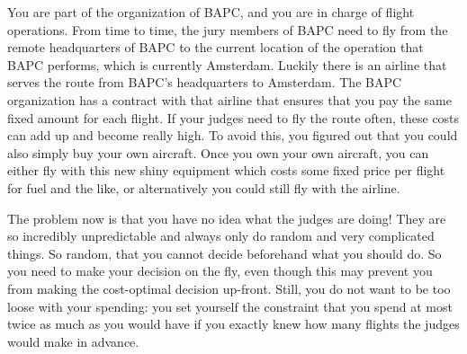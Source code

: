 

\newcommand{\maxa}{10^6}

You are part of the organization of BAPC, and you are in charge of flight operations.
From time to time, the jury members of BAPC
need to fly from the remote headquarters of BAPC to the current location of the operation that BAPC performs,
which is currently Amsterdam.
Luckily there is an airline that serves the route from BAPC's headquarters to Amsterdam.
The BAPC organization has a contract with that airline that ensures that you pay the same fixed amount for each flight.
If your judges need to fly the route often, these costs can add up and become really high.
To avoid this, you figured out that you could also simply buy your own aircraft.
Once you own your own aircraft, you can either fly with this new shiny
equipment which costs some fixed price per flight for fuel and the like, or
alternatively you could still fly with the airline.

The problem now is that you have no idea what the judges are doing!
They are so incredibly unpredictable and always only do random and very
complicated things.
So random, that you cannot decide beforehand what you should do.
So you need to make your decision on the fly, even though this may prevent you
from making the cost-optimal decision up-front.
Still, you do not want to be too loose with your spending:
you set yourself the constraint that you spend at most twice as much as you
would have if you exactly knew how many flights the judges would make in advance.

